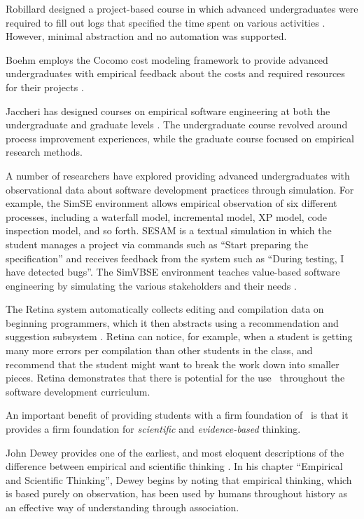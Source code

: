 Robillard designed a project-based course in which advanced undergraduates were required
to fill out logs that specified the time spent on various activities
\citep{Robillard98}.  However, minimal abstraction and no automation was supported.

Boehm employs the Cocomo cost modeling framework to provide advanced undergraduates with
empirical feedback about the costs and required resources for their
projects \citep{Valerdi07}.

Jaccheri has designed courses on empirical software engineering at both the 
undergraduate and graduate levels \citep{Dingsoyr99,Jaccheri05}.  The undergraduate course 
revolved around process improvement experiences, while the graduate course focused on 
empirical research methods.  

A number of researchers have explored providing advanced undergraduates
with observational data about software development practices through
simulation.  For example, the SimSE environment \citep{Navarro07,Navarro09}
allows empirical observation of six different processes, including a
waterfall model, incremental model, XP model, code inspection model, and so
forth.  SESAM \citep{Drappa00} is a textual simulation in which the student
manages a project via commands such as ``Start preparing the
specification'' and receives feedback from the system such as ``During
testing, I have detected bugs''.  The SimVBSE environment teaches
value-based software engineering by simulating the various stakeholders and
their needs \citep{Jain06}.

The Retina system automatically collects editing and compilation data on
beginning programmers, which it then abstracts using a recommendation and
suggestion subsystem \citep{Murphy09}.  Retina can notice, for example,
when a student is getting many more errors per compilation than other
students in the class, and recommend that the student might want to break
the work down into smaller pieces.  Retina demonstrates that there is
potential for the use \eCT\ throughout the software development curriculum.

An important benefit of providing students with a firm foundation of \eCT\
is that it provides a firm foundation for {\em scientific} and {\em
evidence-based} thinking.

John Dewey provides one of the earliest, and most eloquent descriptions of
the difference between empirical and scientific thinking \citep{Dewey10}.
In his chapter ``Empirical and Scientific Thinking'', Dewey begins by
noting that empirical thinking, which is based purely on observation, has
been used by humans throughout history as an effective way of understanding
through association.

